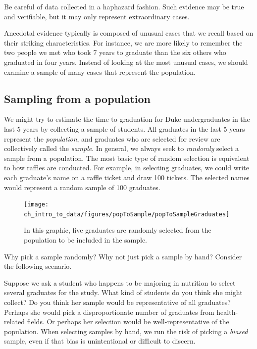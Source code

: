\begin{termBox}{
Be careful of data collected in a haphazard fashion. Such evidence may be true and verifiable, but it may only represent extraordinary cases.}
\end{termBox}

Anecdotal evidence typically is composed of unusual cases that we recall based on their striking characteristics. For instance, we are more likely to remember the two people we met who took 7 years to graduate than the six others who graduated in four years. Instead of looking at the most unusual cases, we should examine a sample of many cases that represent the population.

\subsection{Sampling from a population}


We might try to estimate the time to graduation for Duke undergraduates in the last 5 years by collecting a sample of students. All graduates in the last 5 years represent the \emph{population}, and graduates who are selected for review are collectively called the \emph{sample}. In general, we always seek to \emph{randomly} select a sample from a population. The most basic type of random selection is equivalent to how raffles are conducted. For example, in selecting graduates, we could write each graduate's name on a raffle ticket and draw 100 tickets. The selected names would represent a random sample of 100 graduates.

\begin{figure}[ht]
\centering
\texttt{[image: ch\_intro\_to\_data/figures/popToSample/popToSampleGraduates]}
\caption{In this graphic, five graduates are randomly selected from the population to be included in the sample.}
\label{popToSampleGraduates}
\end{figure}

Why pick a sample randomly? Why not just pick a sample by hand? Consider the following scenario.

\begin{example}{Suppose we ask a student who happens to be majoring in nutrition to select several graduates for the study. What kind of students do you think she might collect? Do you think her sample would be representative of all graduates?}
Perhaps she would pick a disproportionate number of graduates from health-related fields. Or perhaps her selection would be well-representative of the population. When selecting samples by hand, we run the risk of picking a \emph{biased} sample, even if that bias is unintentional or difficult to discern.
\end{example}

